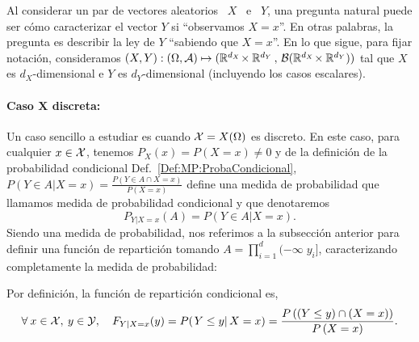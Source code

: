 \label{Sec:MP:LeyesCondicionales}

Al  considerar un  par de  vectores aleatorios  \ $X$  \ e  \ $Y$,  una pregunta
natural  puede  ser c\'omo  caracterizar  el vector  $Y$  si  ``observamos $X  =
x$''.  En otras  palabras, la  pregunta es  describir la  ley de  $Y$ ``sabiendo
  que $X = x$''.  En lo que sigue,  para fijar notaci\'on,
consideramos $(X,Y): (  \Omega , \mathcal{A}) \mapsto (\mathbb{R}^{d_X}  \! \times \mathbb{R}^{d_Y}
\,   ,  \,   \mathcal{B}(\mathbb{R}^{d_X}  \!   \times  \mathbb{R}^{d_Y})   )$  tal   que   $X$  es
$d_X$-dimensional e $Y$ es $d_Y$-dimensional (incluyendo los casos escalares).



\paragraph{Caso $\boldsymbol{X}$ discreta:}
Un caso  sencillo a estudiar  es cuando $\mathcal{X}  = X(\Omega)$ es discreto.   En este
caso, para  cualquier $x  \in \mathcal{X}$, tenemos  $P_X(x) = P(X  = x)  \ne 0$ y  de la
definici\'on de  la probabilidad condicional Def.~\ref{Def:MP:ProbaCondicional},
$P(Y \in A | X = x) = \frac{P(Y \in A \cap X = x)}{P(X=x)}$ define una medida de
probabilidad que llamamos medida de probabilidad condicional y que denotaremos
%
\[
P_{Y|X=x}(A) = P(Y \in A | X = x).
\]
%
Siendo una medida de probabilidad, nos referimos a la subsecci\'on anterior para
definir una funci\'on de  repartici\'on tomando $\displaystyle A = \prod_{i=1}^d
(-\infty \; y_i]$, caracterizando completamente la medida de probabilidad:
%
\begin{definicion}
\label{Def:MP:ReparticionCondicionalDiscreta}
%
  Por definici\'on, la funci\'on de repartici\'on condicional es,
  \[
  \forall \:  x \in  \mathcal{X}, \: y  \in \mathcal{Y}, \quad  F_{Y|X=x}(y) =  P( \left. Y  \le y
  \right| X = x ) = \frac{P\left(  \left(Y \le y \right) \cap \left(X = x\right)
    \right)}{P\left(X = x\right)}.
  \]
\end{definicion}

